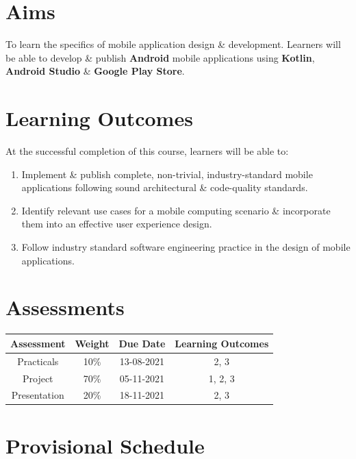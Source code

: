 \documentclass{article}
\begin{document}
\section*{Aims}
To learn the specifics of mobile application design \& development. Learners will be able to develop \& publish \textbf{Android} mobile applications using \textbf{Kotlin}, \textbf{Android Studio} \& \textbf{Google Play Store}.

\section*{Learning Outcomes}
At the successful completion of this course, learners will be able to: 
\begin{enumerate}
	\item Implement \& publish complete, non-trivial, industry-standard mobile applications following sound architectural \& code-quality standards.
	\item Identify relevant use cases for a mobile computing scenario \& incorporate them into an effective user experience design.
	\item Follow industry standard software engineering practice in the design of mobile applications.
\end{enumerate} 

\section*{Assessments}
\renewcommand{\arraystretch}{1.5}	
\begin{tabular}{|c|c|c|c|}
	\hline
	\textbf{Assessment} & \textbf{Weight} & \textbf{Due Date} & \textbf{Learning Outcomes} \\ \hline
	Practicals          & 10\%            & 13-08-2021        & 2, 3                       \\ \hline
	Project             & 70\%            & 05-11-2021        & 1, 2, 3                    \\ \hline
	Presentation        & 20\%            & 18-11-2021        & 2, 3                   \\ \hline
\end{tabular} 

\section*{Provisional Schedule}
\end{document}
